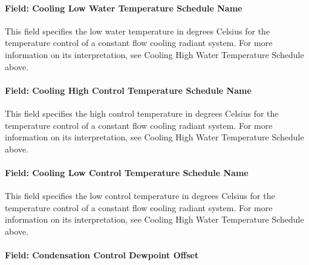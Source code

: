 \paragraph{Field: Cooling Low Water Temperature Schedule Name}\label{field-cooling-low-water-temperature-schedule-name}

This field specifies the low water temperature in degrees Celsius for the temperature control of a constant flow cooling radiant system. For more information on its interpretation, see Cooling High Water Temperature Schedule above.

\paragraph{Field: Cooling High Control Temperature Schedule Name}\label{field-cooling-high-control-temperature-schedule-name}

This field specifies the high control temperature in degrees Celsius for the temperature control of a constant flow cooling radiant system. For more information on its interpretation, see Cooling High Water Temperature Schedule above.

\paragraph{Field: Cooling Low Control Temperature Schedule Name}\label{field-cooling-low-control-temperature-schedule-name}

This field specifies the low control temperature in degrees Celsius for the temperature control of a constant flow cooling radiant system. For more information on its interpretation, see Cooling High Water Temperature Schedule above.

\paragraph{Field: Condensation Control Dewpoint Offset}\label{field-condensation-control-dewpoint-offset-1}

